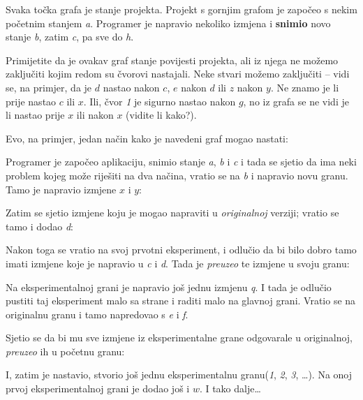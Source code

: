 

Svaka točka grafa je stanje projekta. 
Projekt s gornjim grafom je započeo s nekim početnim stanjem \emph a.
Programer je napravio nekoliko izmjena i \textbf{snimio} novo stanje \emph b, zatim \emph c, pa sve do \emph h.

Primijetite da je ovakav graf stanje povijesti projekta, ali iz njega ne možemo zaključiti kojim redom su čvorovi nastajali.
Neke stvari možemo zaključiti -- vidi se, na primjer, da je $d$ nastao nakon $c$, $e$ nakon $d$ ili $z$ nakon $y$.
Ne znamo je li prije nastao $c$ ili $x$.
Ili, čvor \emph 1 je sigurno nastao nakon $g$, no iz grafa se ne vidi je li nastao prije $x$ ili nakon $x$ (vidite li kako?).

Evo, na primjer, jedan način kako je navedeni graf mogao nastati:



Programer je započeo aplikaciju, snimio stanje \emph a, \emph b i \emph c i tada se sjetio da ima neki problem kojeg može riješiti na dva načina, vratio se na \emph b i napravio novu granu. Tamo je napravio izmjene $x$ i $y$:



Zatim se sjetio izmjene koju je mogao napraviti u \emph{originalnoj} verziji; vratio se tamo i dodao \emph d:



Nakon toga se vratio na svoj prvotni eksperiment, i odlučio da bi bilo dobro tamo imati izmjene koje je napravio u \emph c i \emph d.
Tada je \emph{preuzeo} te izmjene u svoju granu:



Na eksperimentalnoj grani je napravio još jednu izmjenu \emph q.
I tada je odlučio pustiti taj eksperiment malo sa strane i raditi malo na glavnoj grani.
Vratio se na originalnu granu i tamo napredovao s \emph e i \emph f. 



Sjetio se da bi mu sve izmjene iz eksperimentalne grane odgovarale u originalnoj, \emph{preuzeo} ih u početnu granu:



I, zatim je nastavio, stvorio još jednu eksperimentalnu granu(\emph 1, \emph 2, \emph 3, \dots).
Na onoj prvoj eksperimentalnoj grani je dodao još i $w$. I tako dalje\dots

